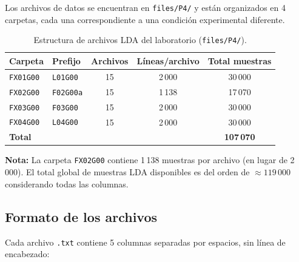 \documentclass[12pt,a4paper]{article}
\begin{document}
Los archivos de datos se encuentran en \texttt{files/P4/} y están
organizados en 4 carpetas, cada una correspondiente a una condición
experimental diferente.

\begin{table}[H]
	\centering
	\caption{Estructura de archivos LDA del laboratorio
		(\texttt{files/P4/}).}
	\label{tab:archivos}
	\begin{tabular}{l l c c c}
		\toprule
		\textbf{Carpeta} & \textbf{Prefijo}        & \textbf{Archivos}
		                 & \textbf{Líneas/archivo}
		                 & \textbf{Total muestras}                     \\
		\midrule
		\texttt{FX01G00} & \texttt{L01G00}         & 15
		                 & 2\,000                  & 30\,000           \\
		\texttt{FX02G00} & \texttt{F02G00a}        & 15
		                 & 1\,138                  & 17\,070           \\
		\texttt{FX03G00} & \texttt{F03G00}         & 15
		                 & 2\,000                  & 30\,000           \\
		\texttt{FX04G00} & \texttt{L04G00}         & 15
		                 & 2\,000                  & 30\,000           \\
		\midrule
		\multicolumn{3}{l}{\textbf{Total}}
		                 &                         & \textbf{107\,070} \\
		\bottomrule
	\end{tabular}
\end{table}

\textbf{Nota:} La carpeta \texttt{FX02G00} contiene 1\,138 muestras por
archivo (en lugar de 2\,000).  El total global de muestras LDA disponibles
es del orden de $\approx 119\,000$ considerando todas las columnas.

\subsection{Formato de los archivos}

Cada archivo \texttt{.txt} contiene 5 columnas separadas por espacios, sin
línea de encabezado:
\end{document}
